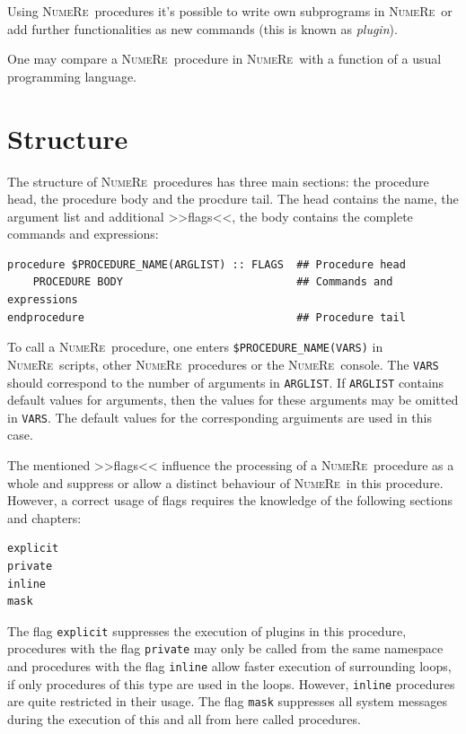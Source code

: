 \documentclass[DIV=14,headsepline,footsepline]{scrbook}
\newcommand{\NR}{\textsc{Nu\-me\-Re}}
\begin{document}
				Using \NR\ procedures it's possible to write own subprograms in \NR\ or add further functionalities as new commands (this is known as \emph{plugin}).
				
				One may compare a \NR\ procedure in \NR\ with a function of a usual programming language.
								
			\section{Structure}
				The structure of \NR\ procedures has three main sections: the procedure head, the procedure body and the procdure tail. The head contains the name, the argument list and additional >>flags<<, the body contains the complete commands and expressions:
				\begin{lstlisting}
procedure $PROCEDURE_NAME(ARGLIST) :: FLAGS  ## Procedure head
	PROCEDURE BODY                           ## Commands and expressions
endprocedure                                 ## Procedure tail
				\end{lstlisting}
				To call a \NR\ procedure, one enters \lstinline+$PROCEDURE_NAME(VARS)+ in \NR\ scripts, other \NR\ procedures or the \NR\ console. The \lstinline+VARS+ should correspond to the number of arguments in \lstinline+ARGLIST+. If \lstinline+ARGLIST+ contains default values for arguments, then the values for these arguments may be omitted in \lstinline+VARS+. The default values for the corresponding arguiments are used in this case.
				
				The mentioned >>flags<< influence the processing of a \NR\ procedure as a whole and suppress or allow a distinct behaviour of \NR\ in this procedure. However, a correct usage of flags requires the knowledge of the following sections and chapters:
				\begin{lstlisting}
explicit
private
inline
mask
				\end{lstlisting}
				The flag \lstinline+explicit+ suppresses the execution of plugins in this procedure, procedures with the flag \lstinline+private+ may only be called from the same namespace and procedures with the flag \lstinline+inline+ allow faster execution of surrounding loops, if only procedures of this type are used in the loops. However, \lstinline+inline+ procedures are quite restricted in their usage. The flag \lstinline+mask+ suppresses all system messages during the execution of this and all from here called procedures.
				
\end{document}
